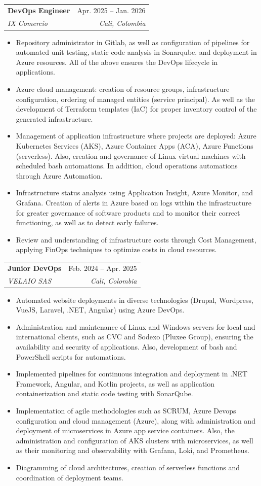\documentclass[letterpaper,11pt]{article}
\makeatletter
\newcommand{\resumeItem}[1]{
  \item\small{
    {#1 \vspace{-2pt}}
  }
}
\newcommand{\resumeSubheading}[4]{
  \vspace{-2pt}\item
    \begin{tabular*}{0.97\textwidth}[t]{l@{\extracolsep{\fill}}r}
      \textbf{#1} & #2 \\
      \textit{\small#3} & \textit{\small #4} \\
    \end{tabular*}\vspace{-7pt}
}
\newcommand{\resumeItemListStart}{\begin{itemize}}
\newcommand{\resumeItemListEnd}{\end{itemize}\vspace{-5pt}}
\makeatother
\begin{document}
\resumeSubheading
    {DevOps Engineer}{Apr. 2025 -- Jan. 2026}
    {IX Comercio}{Cali, Colombia}
    \resumeItemListStart
      \resumeItem{Repository administrator in Gitlab, as well as configuration of pipelines for automated unit testing, static code analysis in Sonarqube, and deployment in Azure resources. All of the above ensures the DevOps lifecycle in applications.}
      \resumeItem{Azure cloud management: creation of resource groups, infrastructure configuration, ordering of managed entities (service principal). As well as the development of Terraform templates (IaC) for proper inventory control of the generated infrastructure.}
      \resumeItem{Management of application infrastructure where projects are deployed: Azure Kubernetes Services (AKS), Azure Container Apps (ACA), Azure Functions (serverless). Also, creation and governance of Linux virtual machines with scheduled bash automations. In addition, cloud operations automations through Azure Automation.}
      \resumeItem{Infrastructure status analysis using Application Insight, Azure Monitor, and Grafana. Creation of alerts in Azure based on logs within the infrastructure for greater governance of software products and to monitor their correct functioning, as well as to detect early failures.}
      \resumeItem{Review and understanding of infrastructure costs through Cost Management, applying FinOps techniques to optimize costs in cloud resources.}
    \resumeItemListEnd

  \resumeSubheading
  {Junior DevOps}{Feb. 2024 -- Apr. 2025}
  {VELAIO SAS}{Cali, Colombia}
  \resumeItemListStart
    \resumeItem{Automated website deployments in diverse technologies (Drupal, Wordpress, VueJS, Laravel, .NET, Angular) using Azure DevOps.}
    \resumeItem{Administration and maintenance of Linux and Windows servers for local and international clients, such as CVC and Sodexo (Pluxee Group), ensuring the availability and security of applications. Also, development of bash and PowerShell scripts for automations.}
    \resumeItem{Implemented pipelines for continuous integration and deployment in .NET Framework, Angular, and Kotlin projects, as well as application containerization and static code testing with SonarQube.}
    \resumeItem{Implementation of agile methodologies such as SCRUM, Azure Devops configuration and cloud management (Azure), along with administration and deployment of microservices in Azure app service containers. Also, the administration and configuration of AKS clusters with microservices, as well as their monitoring and observability with Grafana, Loki, and Prometheus.}
    \resumeItem{Diagramming of cloud architectures, creation of serverless functions and coordination of deployment teams.}
  \resumeItemListEnd
\end{document}

